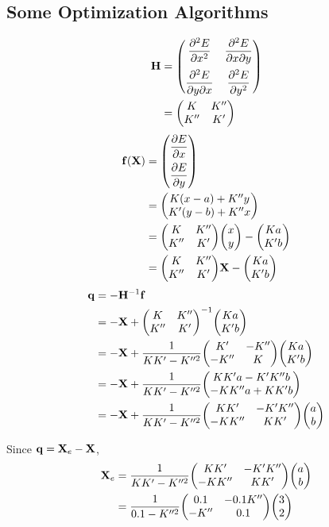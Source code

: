 \documentclass[a4paper]{article}
\begin{document}
\subsection{Some Optimization Algorithms}
\begin{align}
\vb{H} &= \mqty(\dis\pdv[2]{E}{x} & \dis\pdv{E}{x}{y} \vspace{5pt}\\ \dis\pdv{E}{y}{x} & \dis\pdv[2]{E}{y}) \notag\\
&= \mqty(K & K'' \\ K'' & K')
\end{align}
\begin{align}
\vb{f}(\vb{X}) &= \mqty(\dis\pdv{E}{x} \vspace{5pt}\\ \dis\pdv{E}{y}) \notag\\
&= \mqty(K(x-a) + K''y \\ K'(y-b) + K''x) \notag\\
&= \mqty(K & K'' \\ K'' & K')\mqty(x\\ y) - \mqty(K a \\ K' b) \notag\\
&= \mqty(K & K'' \\ K'' & K')\vb{X} - \mqty(K a \\ K' b)
\end{align}
\begin{align}
\vb{q} &= -\vb{H}^{-1}\vb{f} \notag\\
&= -\vb{X} + \mqty(K & K'' \\ K'' & K')^{-1} \mqty(K a \\ K' b) \notag\\
&= -\vb{X} + \dfrac{1}{KK' - K''^2} \mqty(K' & -K''\\ -K'' & K) \mqty(K a \\ K' b) \notag\\
&= -\vb{X} + \dfrac{1}{KK' - K''^2} \mqty(KK' a - K'K'' b \\ -KK'' a + KK' b) \notag\\
&= -\vb{X} + \dfrac{1}{KK' - K''^2} \mqty(KK' & -K'K'' \\ -KK'' & KK' ) \mqty(a\\ b)
\end{align}

Since $ \vb{q} = \vb{X}_e - \vb{X} $,
\begin{align}
\vb{X}_e &= \dfrac{1}{KK' - K''^2} \mqty(KK' & -K'K'' \\ -KK'' & KK' ) \mqty(a\\ b) \notag\\
&= \dfrac{1}{0.1 - K''^2} \mqty(0.1 & -0.1 K'' \\ -K'' & 0.1 ) \mqty(3\\ 2) %
\end{align}
\end{document}
